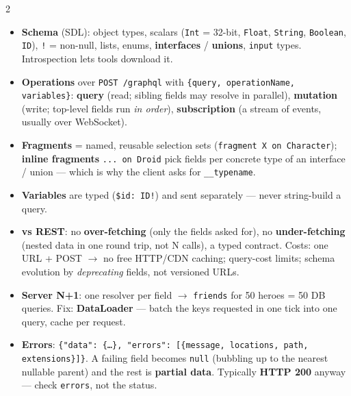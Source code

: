 \documentclass[8pt]{extarticle}
\newcommand\ct[1]{\texttt{#1}}
\newcommand\hd[1]{\par\vspace{3pt}\noindent{\bfseries\color{sheetBlue}#1}\par\vspace{1pt}}
\begin{document}
\begin{multicols}{2}
\footnotesize{}\raggedright

\hd{GraphQL}
\begin{itemize}
  \item \textbf{Schema} (SDL): object types, scalars (\ct{Int} = 32-bit, \ct{Float}, \ct{String},
        \ct{Boolean}, \ct{ID}), \ct{!} = non-null, lists, enums, \textbf{interfaces} / \textbf{unions},
        \ct{input} types. Introspection lets tools download it.
  \item \textbf{Operations} over \ct{POST /graphql} with \ct{\{query, operationName, variables\}}:
        \textbf{query} (read; sibling fields may resolve in parallel), \textbf{mutation} (write;
        top-level fields run \emph{in order}), \textbf{subscription} (a stream of events, usually
        over WebSocket).
  \item \textbf{Fragments} = named, reusable selection sets (\ct{fragment X on Character});
        \textbf{inline fragments} \ct{... on Droid} pick fields per concrete type of an interface /
        union — which is why the client asks for \ct{\_\_typename}.
  \item \textbf{Variables} are typed (\ct{\$id: ID!}) and sent separately — never string-build a query.
  \item \textbf{vs REST}: no \textbf{over-fetching} (only the fields asked for), no
        \textbf{under-fetching} (nested data in one round trip, not N calls), a typed contract. Costs:
        one URL + POST $\to$ no free HTTP/CDN caching; query-cost limits; schema evolution by
        \emph{deprecating} fields, not versioned URLs.
  \item \textbf{Server N+1}: one resolver per field $\to$ \ct{friends} for 50 heroes = 50 DB queries.
        Fix: \textbf{DataLoader} — batch the keys requested in one tick into one query, cache per request.
  \item \textbf{Errors}: \ct{\{"data": \{…\}, "errors": [\{message, locations, path, extensions\}]\}}.
        A failing field becomes \ct{null} (bubbling up to the nearest nullable parent) and the rest is
        \textbf{partial data}. Typically \textbf{HTTP 200} anyway — check \ct{errors}, not the status.
\end{itemize}


\end{multicols}
\end{document}
